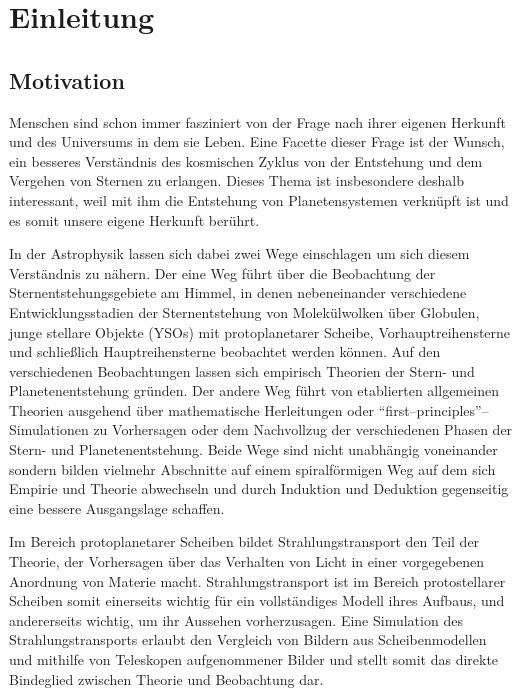 	\chapter{Einleitung}
	\section{Motivation}
	Menschen sind schon immer fasziniert von der Frage nach ihrer eigenen Herkunft und des Universums in dem sie Leben. Eine Facette dieser Frage ist der Wunsch, ein besseres Verständnis des kosmischen Zyklus von der Entstehung und dem Vergehen von Sternen zu erlangen. Dieses Thema ist insbesondere deshalb interessant, weil mit ihm die Entstehung von Planetensystemen verknüpft ist und es somit unsere eigene Herkunft berührt.
	
	In der Astrophysik lassen sich dabei zwei Wege einschlagen um sich diesem Ver\-ständ\-nis zu nähern. Der eine Weg führt über die Beobachtung der Sternentstehungsgebiete am Himmel, in denen nebeneinander verschiedene Entwicklungsstadien der Sternentstehung von Molekülwolken über Globulen, junge stellare Objekte (YSOs) mit protoplanetarer Scheibe, Vorhauptreihensterne und schließlich Hauptreihensterne beobachtet werden können.
	Auf den verschiedenen Beobachtungen lassen sich empirisch Theorien der Stern- und Planetenentstehung gründen. Der andere Weg führt von etablierten allgemeinen Theorien ausgehend über mathematische Herleitungen oder ``first--principles''--Simulationen zu Vorhersagen oder dem Nachvollzug der verschiedenen Phasen der Stern- und Planetenentstehung. Beide Wege sind nicht unabhängig voneinander sondern bilden vielmehr Abschnitte auf einem spiralförmigen Weg auf dem sich Empirie und Theorie abwechseln und durch Induktion und Deduktion gegenseitig eine bessere Ausgangslage schaffen.
	
	Im Bereich protoplanetarer Scheiben bildet Strahlungstransport den Teil der Theorie, der Vorhersagen über das Verhalten von Licht in einer vorgegebenen Anordnung von Materie macht. Strahlungstransport ist im Bereich protostellarer Scheiben somit einerseits wichtig für ein vollständiges Modell ihres Aufbaus, und andererseits wichtig, um ihr Aussehen vorherzusagen. Eine Simulation des Strahlungstransports erlaubt den Vergleich von Bildern aus Scheibenmodellen und mithilfe von Teleskopen aufgenommener Bilder und stellt somit das direkte Bindeglied zwischen Theorie und Beobachtung dar.
	
